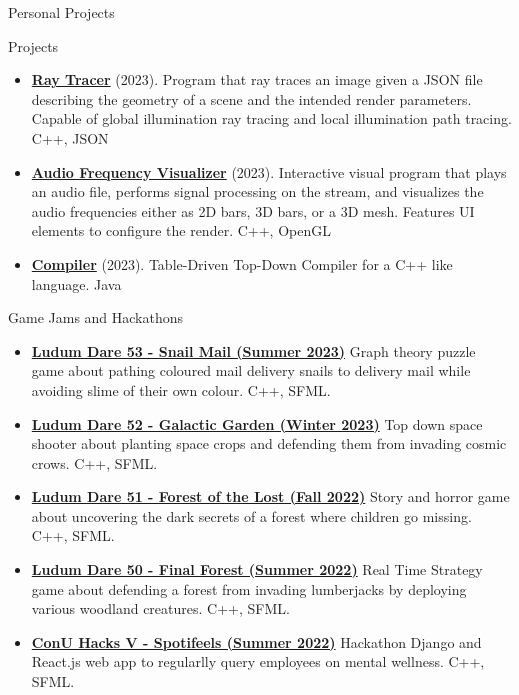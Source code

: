 \documentclass[]{mcdowellcv}
\begin{document}
	\begin{cvsection}{Personal Projects}
		\begin{cvsubsection}{Projects}{}{}
			\begin{itemize}
				\item \textbf{\href{https://github.com/adrientremblay/RayTracer}{Ray Tracer}} (2023). Program that ray traces an image given a JSON file describing the geometry of a scene and the intended render parameters. Capable of global illumination ray tracing and local illumination path tracing. C++, JSON 
                \item \textbf{\href{https://github.com/adrientremblay/AudioVisualizer}{Audio Frequency Visualizer}} (2023). Interactive visual program that plays an audio file, performs signal processing on the stream, and visualizes the audio frequencies either as 2D bars, 3D bars, or a 3D mesh. Features UI elements to configure the render. C++, OpenGL 
                \item \textbf{\href{https://github.com/adrientremblay/Compiler}{Compiler}} (2023). Table-Driven Top-Down Compiler for a C++ like language. Java
			\end{itemize}
		\end{cvsubsection}
	\end{cvsection}
	
	\begin{cvsection}{Game Jams and Hackathons}
		\begin{cvsubsection}{}{}{}	
			\begin{itemize}
                \item \textbf{\href{https://ldjam.com/events/ludum-dare/53/snail-mail-2}{Ludum Dare 53 - Snail Mail (Summer 2023)}} Graph theory puzzle game about pathing coloured mail delivery snails to delivery mail while avoiding slime of their own colour. C++, SFML.
				\item \textbf{\href{https://ldjam.com/events/ludum-dare/52/galactic-garden}{Ludum Dare 52 - Galactic Garden (Winter 2023)}} Top down space shooter about planting space crops and defending them from invading cosmic crows. C++, SFML.
				\item \textbf{\href{https://ldjam.com/events/ludum-dare/51/forest-of-the-lost}{Ludum Dare 51 - Forest of the Lost (Fall 2022)}} Story and horror game about uncovering the dark secrets of a forest where children go missing. C++, SFML.
				\item \textbf{\href{https://ldjam.com/events/ludum-dare/50/final-forest}{Ludum Dare 50 - Final Forest (Summer 2022)}} Real Time Strategy game about defending a forest from invading lumberjacks by deploying various woodland creatures. C++, SFML.
				\item \textbf{\href{https://github.com/Team-Blockchain-Ai-Machine-Learning/Spotifeels}{ConU Hacks V - Spotifeels (Summer 2022)}} Hackathon Django and React.js web app to regularlly query employees on mental wellness. C++, SFML.
			\end{itemize}
		\end{cvsubsection}
	\end{cvsection}
	
\end{document}
